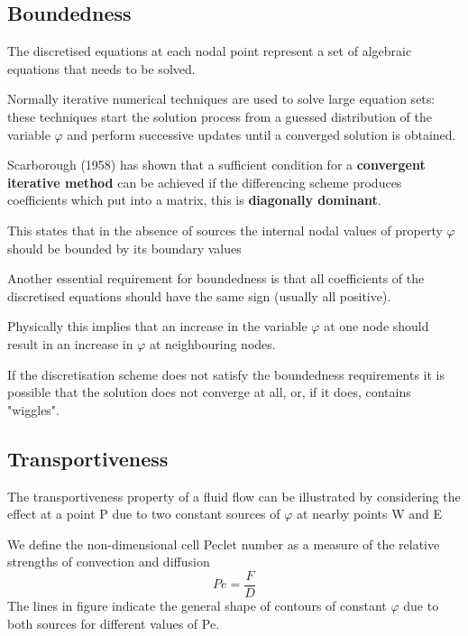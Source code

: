 \documentclass[a4paper, 15pt]{article}
\begin{document}
\subsection{Boundedness}

	The
	discretised equations at each nodal point represent a set of algebraic equations that needs
	to be solved. \newline 
	
	Normally
	iterative numerical techniques are used to solve large equation sets: these techniques
	start the solution process from a guessed distribution of the variable $\varphi$ and perform successive
	updates until a converged solution is obtained. \newline 
	
	Scarborough (1958) has shown that a sufficient condition for a \textbf{convergent iterative method} can be achieved if 
	the differencing scheme produces coefficients which put into a matrix, this is \textbf{diagonally dominant}. \newline 
	
	
	\begin{tcolorbox}[colback=red!5!white,colframe=red!75!black,title=Take Home Message]
		This states
	that in the absence of sources the internal nodal values of property $\varphi$ should be bounded by its
	boundary values
	\end{tcolorbox}
	
	Another
	essential requirement for boundedness is that all coefficients of the discretised
	equations should have the same sign (usually all positive). 
	
	Physically
	this implies that an increase in the variable $\varphi$ at one node should result in an increase
	in $\varphi$ at neighbouring nodes. \newline 
	
	If
	the discretisation scheme does not satisfy the boundedness requirements it is possible that the
	solution does not converge at all, or, if it does, contains "wiggles".


\subsection{Transportiveness}

The transportiveness property of a fluid flow can be illustrated by considering the
effect at a point P due to two constant sources of $\varphi$ at nearby points W and E

We define the non-dimensional cell Peclet number as a measure of the relative strengths of
convection and diffusion
\[Pe = \dfrac{F}{D}\]
The
lines in figure indicate the general shape of contours of constant $\varphi$ due to both
sources for different values of Pe.
\end{document}
